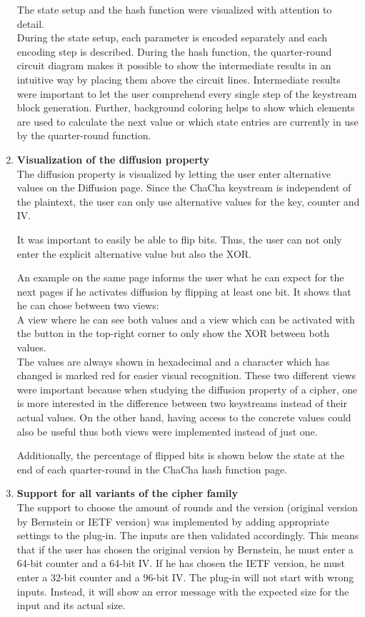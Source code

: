 \begin{enumerate}[label=(\labelenum{G}{{\arabic*}}), wide, labelwidth=!, labelindent=0pt]
     The state setup and the hash function were visualized with attention to detail. \\
     During the state setup, each parameter is encoded separately and each encoding step is described. During the hash function, the quarter-round circuit diagram makes it possible to show the intermediate results in an intuitive way by placing them above the circuit lines. Intermediate results were important to let the user comprehend every single step of the keystream block generation. Further, background coloring helps to show which elements are used to calculate the next value or which state entries are currently in use by the quarter-round function.
     
     \item \textbf{Visualization of the diffusion property}\\
     The diffusion property is visualized by letting the user enter alternative values on the Diffusion page. Since the ChaCha keystream is independent of the plaintext, the user can only use alternative values for the key, counter and IV.
     
     It was important to easily be able to flip bits. Thus, the user can not only enter the explicit alternative value but also the XOR.
     
     An example on the same page informs the user what he can expect for the next pages if he activates diffusion by flipping at least one bit. It shows that he can chose between two views: \\
     A view where he can see both values and a view which can be activated with the button in the top-right corner to only show the XOR between both values.\\
     The values are always shown in hexadecimal and a character which has changed is marked red for easier visual recognition. These two different views were important because when studying the diffusion property of a cipher, one is more interested in the difference between two keystreams instead of their actual values. On the other hand, having access to the concrete values could also be useful thus both views were implemented instead of just one.
     
     Additionally, the percentage of flipped bits is shown below the state at the end of each quarter-round in the ChaCha hash function page.
     
     \item \textbf{Support for all variants of the cipher family}\\
     The support to choose the amount of rounds and the version (original version by Bernstein or IETF version) was implemented by adding appropriate settings to the plug-in. The inputs are then validated accordingly. This means that if the user has chosen the original version by Bernstein, he must enter a 64-bit counter and a 64-bit IV. If he has chosen the IETF version, he must enter a 32-bit counter and a 96-bit IV. The plug-in will not start with wrong inputs. Instead, it will show an error message with the expected size for the input and its actual size.
     

\end{enumerate}
